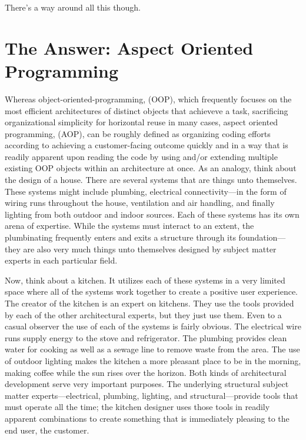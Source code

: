 \documentclass[twocolumn,letterpaper]{IEEEAerospaceCLS}  %
\begin{document}
There's a way around all this though.

\section{The Answer: Aspect Oriented Programming}
Whereas object-oriented-programming, (OOP), which frequently focuses on the most efficient architectures of distinct objects that achieveve a task, sacrificing organizational simplicity for horizontal reuse in many cases, aspect oriented programming, (AOP), can be roughly defined as organizing coding efforts according to achieving a customer-facing outcome quickly and in a way that is readily apparent upon reading the code by using and/or extending multiple existing OOP objects within an architecture at once. As an analogy, think about the design of a house. There are several systems that are things unto themselves. These systems might include plumbing, electrical connectivity—in the form of wiring runs throughout the house, ventilation and air handling, and finally lighting from both outdoor and indoor sources. Each of these systems has its own arena of expertise. While the systems must interact to an extent, the plumbinating frequently enters and exits a structure through its foundation—they are also very much things unto themselves designed by subject matter experts in each particular field.

Now, think about a kitchen. It utilizes each of these systems in a very limited space where all of the systems work together to create a positive user experience. The creator of the kitchen is an expert on kitchens. They use the tools provided by each of the other architectural experts, but they just use them. Even to a casual observer the use of each of the systems is fairly obvious. The electrical wire runs supply energy to the stove and refrigerator. The plumbing provides clean water for cooking as well as a sewage line to remove waste from the area. The use of outdoor lighting makes the kitchen a more pleasant place to be in the morning, making coffee while the sun rises over the horizon. 
Both kinds of architectural development serve very important purposes. The underlying structural subject matter experts—electrical, plumbing, lighting, and structural—provide tools that must operate all the time; the kitchen designer uses those tools in readily apparent combinations to create something that is immediately pleasing to the end user, the customer.
\end{document}

